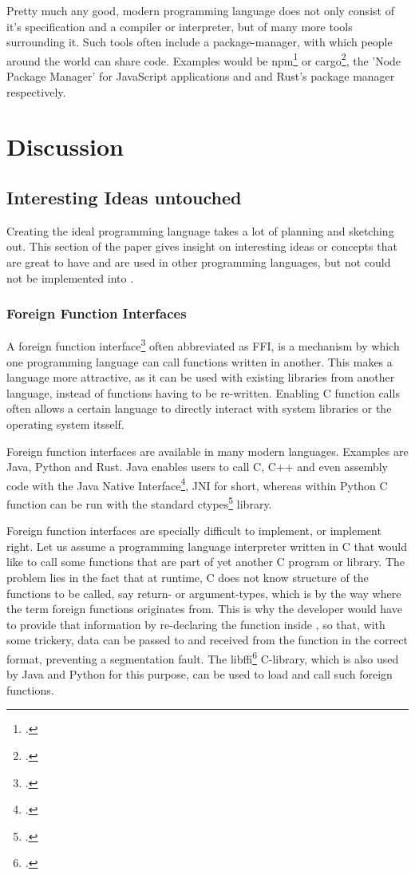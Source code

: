 \documentclass[12pt,a4paper,man]{apa7}
\begin{document}
Pretty much any good, modern programming language does not only consist
of it's specification and a compiler or interpreter, but of many more
tools surrounding it.
Such tools often include a package-manager, with which people around the world
can share code. Examples would be npm\footcite{npm} or cargo\footcite{cargo}, 
the 'Node Package Manager' for JavaScript applications and and Rust's package 
manager respectively.

\section{Discussion}

\subsection{Interesting Ideas untouched}
Creating the ideal programming language takes a lot of planning and sketching
out. This section of the paper gives insight on interesting ideas or concepts
that are great to have and are used in other programming languages, but not 
could not be implemented into \name.

\subsubsection{Foreign Function Interfaces}
A foreign function interface\footcite{FFI} often abbreviated as FFI,
is a mechanism by which one programming language can call functions written 
in another. This makes a language more attractive, as it can be used with
existing libraries from another language, instead of functions having to be
re-written. Enabling C function calls often allows a certain language to
directly interact with system libraries or the operating system itsself.

Foreign function interfaces are available in many modern languages.
Examples are Java, Python and Rust.
Java enables users to call C, C++ and even assembly code with the Java Native
Interface\footcite{JNI}, JNI for short, whereas within Python C function can
be run with the standard ctypes\footcite{ctypes} library.

Foreign function interfaces are specially difficult to implement, or implement
right. Let us assume a programming language interpreter \name written in C that
would like to call some functions that are part of yet another C program or
library. The problem lies in the fact that at runtime, C does not know
structure of the functions to be called, say return- or argument-types, which
is by the way where the term foreign functions originates from. This is why the
\name developer would have to provide that information by re-declaring the
function inside \name, so that, with some trickery, data can be passed to and
received from the function in the correct format, preventing a segmentation
fault. The libffi\footcite{libffi} C-library, which is also used by Java and
Python for this purpose, can be used to load and call such foreign functions.
\end{document}
